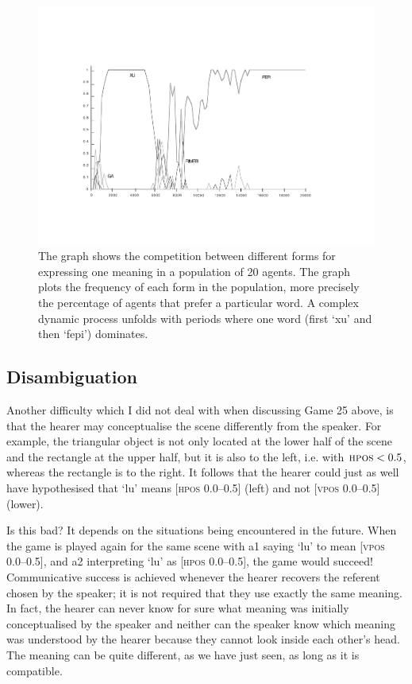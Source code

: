\begin{figure}[htbp]
  \centerline{\includegraphics[width=\textwidth]{chap2/figs/competition-1.pdf}}
\caption{\label{competition1}The graph shows the competition between different forms for
expressing one meaning in a population of 20 agents. The graph plots 
the frequency of each form in the population, more precisely the percentage
of agents that prefer a particular word. A complex dynamic
process unfolds with periods where one word (first `xu' and then `fepi') dominates.} 
\end{figure}

\subsection{Disambiguation}

Another difficulty which I did not deal with when discussing Game 25 above,
is that the hearer may conceptualise
the scene differently from the speaker. For example, 
the triangular object is not only located at the lower half
of the scene and the rectangle at the upper half, 
but it is also to the left, i.e. with $\textsc{hpos} < 0.5$, whereas
the rectangle is to the right. It follows that the 
hearer could just as well have hypothesised that `lu' means [\textsc{hpos} 0.0–0.5] (left)
and not [\textsc{vpos} 0.0–0.5] (lower). 

Is this bad? It depends on the situations being encountered
in the future. When the game is played again for the
same scene with {\bfshape a1} saying `lu' to mean [\textsc{vpos} 0.0–0.5], and 
{\bfshape a2} interpreting `lu' as [\textsc{hpos} 0.0–0.5], the game would succeed! 
Communicative success is achieved whenever the 
hearer recovers the referent chosen by the 
speaker; it is not required that they 
use exactly the same meaning. In fact, the hearer can never know
for sure what meaning was initially conceptualised by the speaker and 
neither can the speaker know which meaning was understood 
by the hearer because they cannot look inside each
other's head. The meaning can be quite different, 
as we have just seen, as long as it is compatible. 

